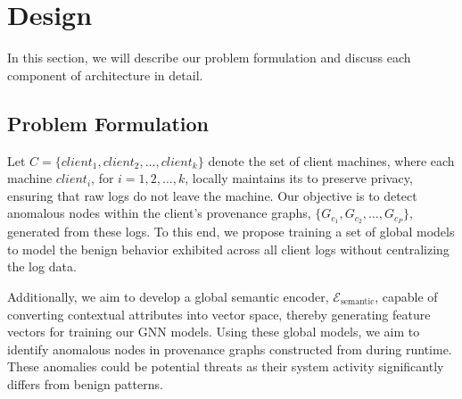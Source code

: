 \section{\Sys Design}
\label{sec:methodology}

In this section, we will describe our problem formulation and discuss each component of \Sys architecture in detail.






\subsection{Problem Formulation}



Let \( C = \{client_1, client_2, \ldots, client_k\} \) denote the set of client machines, where each machine \( client_i \), for \( i = 1, 2, \ldots, k \), locally maintains its \logs to preserve privacy, ensuring that raw logs do not leave the machine. Our objective is to detect anomalous nodes within the client's provenance graphs, \( \{G_{c_1}, G_{c_2}, \ldots, G_{c_P}\} \), generated from these logs. To this end, we propose training a set of global \gnnshort models to model the benign behavior exhibited across all client logs without centralizing the log data.

Additionally, we aim to develop a global semantic encoder, \( \mathcal{E}_{\text{semantic}} \), capable of converting contextual attributes into vector space, thereby generating feature vectors for training our GNN models. Using these global \gnnshort models, we aim to identify anomalous nodes in provenance graphs constructed from \logs during runtime. These anomalies could be potential threats as their system activity significantly differs from benign patterns.

